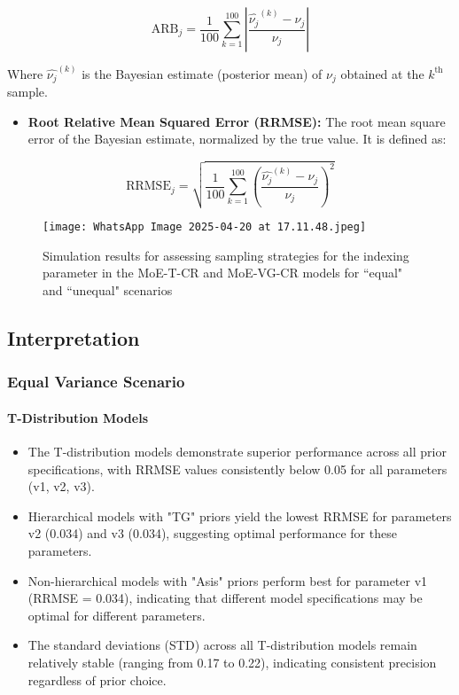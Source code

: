 \documentclass[10.5pt]{article} %
\begin{document}
\[
\text{ARB}_j = \frac{1}{100} \sum_{k=1}^{100} \left| \frac{\hat{\nu_j}^{(k)} - \nu_j}{\nu_j} \right|
\]

\noindent
Where \( \hat{\nu_j}^{(k)} \) is the Bayesian estimate (posterior mean) of \( \nu_j \) obtained at the \( k^{\text{th}} \) sample.

\begin{itemize}
    \item \textbf{Root Relative Mean Squared Error (RRMSE):} The root mean square error of the Bayesian estimate, normalized by the true value. It is defined as:
\end{itemize}

\[
\text{RRMSE}_j = \sqrt{\frac{1}{100} \sum_{k=1}^{100} \left( \frac{\hat{\nu_j}^{(k)} - \nu_j}{\nu_j} \right)^2}
\]
\begin{figure}[H]
    \centering
    \texttt{[image: WhatsApp Image 2025-04-20 at 17.11.48.jpeg]} %
    \caption{Simulation results for assessing sampling strategies for the indexing parameter in the MoE-T-CR and MoE-VG-CR models for “equal" and “unequal" scenarios}
    \label{fig:your_label} %
\end{figure}

\subsection{Interpretation}

\subsubsection{Equal Variance Scenario}

\paragraph{T-Distribution Models}
\begin{itemize}
    \item The T-distribution models demonstrate superior performance across all prior specifications, with RRMSE values consistently below 0.05 for all parameters (v1, v2, v3).
    \item Hierarchical models with "TG" priors yield the lowest RRMSE for parameters v2 (0.034) and v3 (0.034), suggesting optimal performance for these parameters.
    \item Non-hierarchical models with "Asis" priors perform best for parameter v1 (RRMSE = 0.034), indicating that different model specifications may be optimal for different parameters.
    \item The standard deviations (STD) across all T-distribution models remain relatively stable (ranging from 0.17 to 0.22), indicating consistent precision regardless of prior choice.
\end{itemize}
\end{document}
